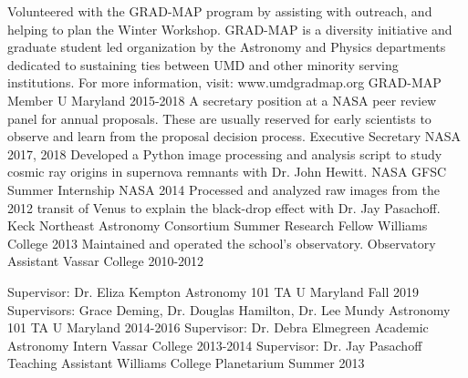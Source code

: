 \documentclass[]{awesome-cv}
\begin{document}
\begin{cventries}
	\cventry
	{Volunteered with the GRAD-MAP program by assisting with outreach, and helping to plan the Winter Workshop. GRAD-MAP is a diversity initiative and graduate student led organization by the Astronomy and Physics departments dedicated to sustaining ties between UMD and other minority serving institutions. For more information, visit: www.umdgradmap.org}
	{GRAD-MAP Member}
	{U Maryland}
	{2015-2018}
	{}
	\cventry
	{A secretary position at a NASA peer review panel for annual proposals. These are usually reserved for early scientists to observe and learn from the proposal decision process.}
	{Executive Secretary}
	{NASA}
	{2017, 2018}
	{}
	\cventry
	{Developed a Python image processing and analysis script to study cosmic ray origins in supernova remnants with Dr. John Hewitt.}
	{NASA GFSC Summer Internship}
	{NASA}
	{2014}
	{}
	\cventry
	{Processed and analyzed raw images from the 2012 transit of Venus to explain the black-drop effect with Dr. Jay Pasachoff.}
	{Keck Northeast Astronomy Consortium Summer Research Fellow }
	{Williams College}
	{2013}
	{}
	\cventry
	{Maintained and operated the school's observatory.}
	{Observatory Assistant}
	{Vassar College}
	{2010-2012}
	{}
	
	\vspace{-7mm}
\end{cventries}

\begin{cventries}
	\cventry
	{Supervisor: Dr. Eliza Kempton}
	{Astronomy 101 TA}
	{U Maryland}
	{Fall 2019}
	{}
	\cventry
	{Supervisors: Grace Deming, Dr. Douglas Hamilton, Dr. Lee Mundy}
	{Astronomy 101 TA}
	{U Maryland}
	{2014-2016}
	{}
	\cventry
	{Supervisor: Dr. Debra Elmegreen}
	{Academic Astronomy Intern}
	{Vassar College}
	{2013-2014}
	{}
	\cventry
	{Supervisor: Dr. Jay Pasachoff}
	{Teaching Assistant}
	{Williams College Planetarium}
	{Summer 2013}
	{}
\end{cventries}
\end{document}
